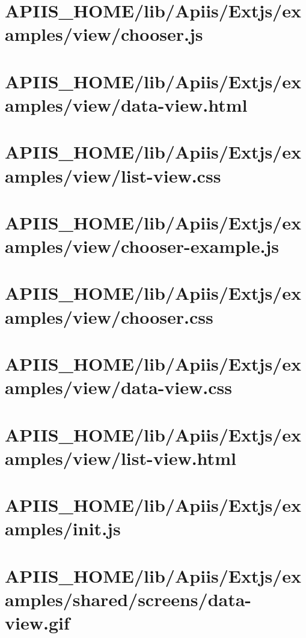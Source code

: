 \section{APIIS\_HOME/lib/Apiis/Extjs/examples/view/chooser.js} 
\section{APIIS\_HOME/lib/Apiis/Extjs/examples/view/data-view.html} 
\section{APIIS\_HOME/lib/Apiis/Extjs/examples/view/list-view.css} 
\section{APIIS\_HOME/lib/Apiis/Extjs/examples/view/chooser-example.js} 
\section{APIIS\_HOME/lib/Apiis/Extjs/examples/view/chooser.css} 
\section{APIIS\_HOME/lib/Apiis/Extjs/examples/view/data-view.css} 
\section{APIIS\_HOME/lib/Apiis/Extjs/examples/view/list-view.html} 
\section{APIIS\_HOME/lib/Apiis/Extjs/examples/init.js} 
\section{APIIS\_HOME/lib/Apiis/Extjs/examples/shared/screens/data-view.gif} 
